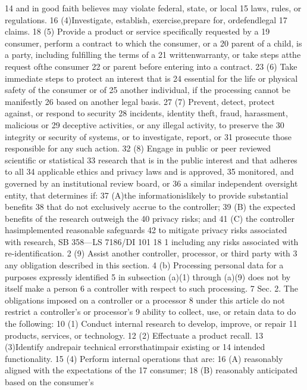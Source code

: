 14 and in good faith believes may violate federal, state, or local
15 laws, rules, or regulations.
16 (4)Investigate, establish, exercise,prepare for, ordefendlegal
17 claims.
18 (5) Provide a product or service specifically requested by a
19 consumer, perform a contract to which the consumer, or a
20 parent of a child, is a party, including fulfilling the terms of a
21 writtenwarranty, or take steps atthe request ofthe consumer
22 or parent before entering into a contract.
23 (6) Take immediate steps to protect an interest that is
24 essential for the life or physical safety of the consumer or of
25 another individual, if the processing cannot be manifestly
26 based on another legal basis.
27 (7) Prevent, detect, protect against, or respond to security
28 incidents, identity theft, fraud, harassment, malicious or
29 deceptive activities, or any illegal activity, to preserve the
30 integrity or security of systems, or to investigate, report, or
31 prosecute those responsible for any such action.
32 (8) Engage in public or peer reviewed scientific or statistical
33 research that is in the public interest and that adheres to all
34 applicable ethics and privacy laws and is approved,
35 monitored, and governed by an institutional review board, or
36 a similar independent oversight entity, that determines if:
37 (A)the informationislikely to provide substantial benefits
38 that do not exclusively accrue to the controller;
39 (B) the expected benefits of the research outweigh the
40 privacy risks; and
41 (C) the controller hasimplemented reasonable safeguards
42 to mitigate privacy risks associated with research,
SB 358—LS 7186/DI 101
18
1 including any risks associated with re-identification.
2 (9) Assist another controller, processor, or third party with
3 any obligation described in this section.
4 (b) Processing personal data for a purposes expressly identified
5 in subsection (a)(1) through (a)(9) does not by itself make a person
6 a controller with respect to such processing.
7 Sec. 2. The obligations imposed on a controller or a processor
8 under this article do not restrict a controller's or processor's
9 ability to collect, use, or retain data to do the following:
10 (1) Conduct internal research to develop, improve, or repair
11 products, services, or technology.
12 (2) Effectuate a product recall.
13 (3)Identify andrepair technical errorsthatimpair existing or
14 intended functionality.
15 (4) Perform internal operations that are:
16 (A) reasonably aligned with the expectations of the
17 consumer;
18 (B) reasonably anticipated based on the consumer's
